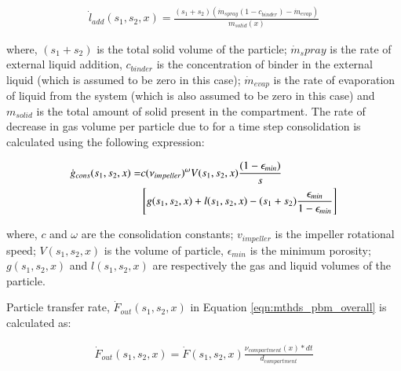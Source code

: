 \documentclass[preprint,11pt,authoryear]{elsarticle}
\begin{document}
\begin{align}
\dot{l}_{add}(s_1,s_2,x) = \frac{(s_1+s_2)(\dot{m}_{spray}(1-c_{binder})-\dot{m}_{evap})}{m_{solid}(x)}
\end{align}

where, $(s_1+s_2)$  is the total solid volume of the particle; $\dot{m}_spray$ is the rate of external 
liquid addition, $c_{binder}$ is the concentration of binder in the external liquid (which is assumed to 
be zero in this case); $\dot{m}_{evap}$ is the rate of evaporation of liquid from 
the system (which is also assumed to be zero in this case) and $m_{solid}$ is the total amount of solid 
present in the compartment.
The rate of decrease in gas volume per particle due to for a time step consolidation is calculated using the 
following expression: \citep{Verkoeijen2002} 

\begin{align}
\dot{g}_{cons}(s_1,s_2,x)=&c (\nu_{impeller})^{\omega}V(s_1,s_2,x)\frac{(1-\epsilon_{min})}{s} 
\notag \\ 
& \left[g(s_1,s_2,x)+l(s_1,s_2,x) -(s_1+s_2)\frac{\epsilon_{min}}{1-\epsilon_{min}}\right]
\end{align}        

 where, $c$ and $\omega$ are the consolidation constants; $v_{impeller}$ is the impeller 
rotational speed; $V(s_1,s_2,x)$ is the volume of particle, $\epsilon_{min}$ is the minimum porosity; 
$g(s_1,s_2,x)$ and $l(s_1,s_2,x)$ are respectively the gas and liquid volumes of the particle.

Particle transfer rate, $\dot{F}_{out}(s_1,s_2,x)$ in Equation \ref{eqn:mthds_pbm_overall} is calculated 
as:

\begin{align}
\dot{F}_{out}(s_1,s_2,x) = \dot{F}(s_1,s_2,x)\frac{\nu_{compartment}(x)*dt}{d_{compartment}}
\end{align}
\end{document}
